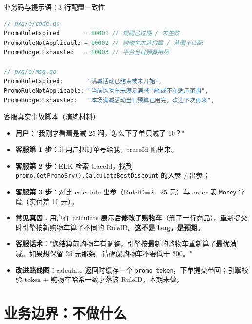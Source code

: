 \documentclass[aspectratio=169,11pt]{beamer}
\begin{document}
\begin{frame}{业务码与提示语：3 行配置一致性}
\begin{lstlisting}[language=Go,firstnumber=61,
  caption={}]
// pkg/e/code.go
PromoRuleExpired       = 80001 // 规则已过期 / 未生效
PromoRuleNotApplicable = 80002 // 购物车未达门槛 / 范围不匹配
PromoBudgetExhausted   = 80003 // 平台当日预算用尽

// pkg/e/msg.go
PromoRuleExpired:       "满减活动已结束或未开始",
PromoRuleNotApplicable: "当前购物车未满足满减门槛或不在适用范围",
PromoBudgetExhausted:   "本场满减活动当日预算已用完，欢迎下次再来",
\end{lstlisting}
\end{frame}

\begin{frame}[shrink]{客服真实事故脚本（演练材料）}
\begin{itemize}
  \item \textbf{用户}："我刚才看着是减 25 啊，怎么下了单只减了 10？"
  \item \textbf{客服第 1 步}：让用户把订单号给我，traceId 贴出来。
  \item \textbf{客服第 2 步}：ELK 检索 traceId，找到 \texttt{promo.GetPromoSrv().CalculateBestDiscount} 的入参 / 出参；
  \item \textbf{客服第 3 步}：对比 calculate 出参（RuleID=2，25 元）与 order 表 \texttt{Money} 字段（实付差 10 元）。
  \item \textbf{常见真因}：用户在 calculate 展示后\textbf{修改了购物车}（删了一行商品），重新提交时引擎按新购物车算了不同的 RuleID。\textbf{这不是 bug，是预期}。
  \item \textbf{客服话术}："您结算前购物车有调整，引擎按最新的购物车重新算了最优满减。如果想保留 25 元那条，请确保购物车不要低于 200。"
  \item \textbf{改进路线图}：calculate 返回时缓存一个 \texttt{promo\_token}，下单提交带回；引擎校验 token + 购物车哈希一致才落该 RuleID。本期未做。
\end{itemize}
\end{frame}

\section{业务边界：不做什么}
\end{document}
